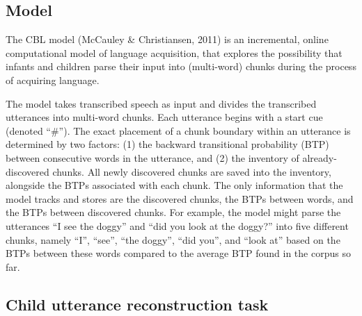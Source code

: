 \documentclass[man,mask,floatsintext]{apa6}
\theoremstyle{definition}
\theoremstyle{definition}
\theoremstyle{definition}
\theoremstyle{remark}
\begin{document}
\subsection{Model}\label{model}

The CBL model (McCauley \& Christiansen, 2011) is an incremental, online
computational model of language acquisition, that explores the
possibility that infants and children parse their input into
(multi-word) chunks during the process of acquiring language.

The model takes transcribed speech as input and divides the transcribed
utterances into multi-word chunks. Each utterance begins with a start
cue (denoted \enquote{\#}). The exact placement of a chunk boundary
within an utterance is determined by two factors: (1) the backward
transitional probability (BTP) between consecutive words in the
utterance, and (2) the inventory of already-discovered chunks. All newly
discovered chunks are saved into the inventory, alongside the BTPs
associated with each chunk. The only information that the model tracks
and stores are the discovered chunks, the BTPs between words, and the
BTPs between discovered chunks. For example, the model might parse the
utterances \enquote{I see the doggy} and \enquote{did you look at the
doggy?} into five different chunks, namely \enquote{I}, \enquote{see},
\enquote{the doggy}, \enquote{did you}, and \enquote{look at} based on
the BTPs between these words compared to the average BTP found in the
corpus so far.

\subsection{Child utterance reconstruction
task}\label{child-utterance-reconstruction-task}
\end{document}
